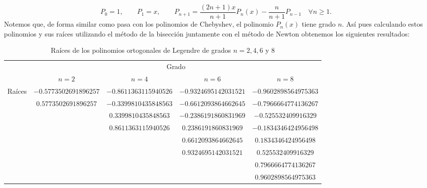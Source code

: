 \documentclass[a4paper]{article}
\begin{document}
$$P_0=1,\qquad P_1=x,\qquad P_{n+1}=\frac{(2n+1)x}{n+1}P_n(x)-\frac{n}{n+1}P_{n-1}\quad\forall n\geq 1.$$ Notemos que, de forma similar como pasa con los polinomios de Chebyshev, el polinomio $P_n(x)$ tiene grado $n$. Así pues calculando estos polinomios y sus raíces utilizando el método de la bisección juntamente con el método de Newton obtenemos los siguientes resultados:
\begin{table}[ht]
    \centering
    \begin{tabular}{|c|c|c|c|c|}
        \cline{2-5}
        \multicolumn{1}{c|}{} & \multicolumn{4}{c|}{Grado}\\
        \cline{2-5}
        \multicolumn{1}{c|}{} & $n=2$ & $n=4$ & $n=6$ & $n=8$ \\
        \hline
        \multirow{8}{*}{Raíces} & $-0.5773502691896257$ & $-0.8611363115940526$ & $-0.9324695142031521$ & $-0.9602898564975363$ \\
        & $0.5773502691896257$ & $-0.3399810435848563$ & $-0.6612093864662645$ & $-0.7966664774136267$ \\
        & & $0.3399810435848563$ & $-0.2386191860831969$ & $-0.525532409916329$ \\
        & & $0.8611363115940526$ & $0.2386191860831969$ & $-0.1834346424956498$ \\
        & & & $0.6612093864662645$ & $0.1834346424956498$ \\
        & & & $0.9324695142031521$ & $0.525532409916329$ \\
        & & & & $0.7966664774136267$ \\
        & & & & $0.9602898564975363$ \\
        \hline
    \end{tabular}
    \caption{Raíces de los polinomios ortogonales de Legendre de grados $n=2,4,6\text{ y }8$}
\end{table}
\end{document}
